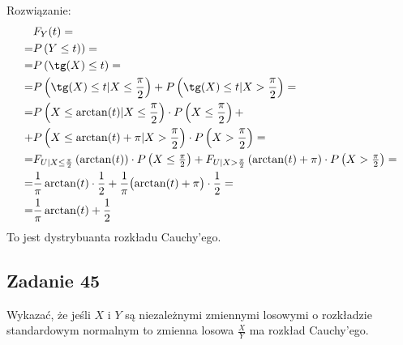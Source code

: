 Rozwiązanie:
\begin{align*}
&F_Y(t)
=\\=&
P\left(Y\le t)\right)
=\\=&
P\left(\tg(X)\le t\right)
=\\=&
P\left(\tg(X)\le t|X\le\frac{\pi}{2}\right)
+
P\left(\tg(X)\le t|X>\frac{\pi}{2}\right)
=\\=&
P\left(X\le\arctan(t)|X\le\frac{\pi}{2}\right)\cdot P\left(X\le\frac{\pi}{2}\right)
+\\+&
P\left(X\le\arctan(t)+\pi|X>\frac{\pi}{2}\right)\cdot P\left(X>\frac{\pi}{2}\right)
=\\=&
F_{U|X\le\frac{\pi}{2}}\left(\arctan(t)\right)\cdot P\left(X\le\tfrac{\pi}{2}\right)+
F_{U|X>\frac{\pi}{2}}\left(\arctan(t)+\pi\right)\cdot P\left(X>\tfrac{\pi}{2}\right)
=\\=&
\frac{1}{\pi}\arctan(t)\cdot \frac{1}{2}+
\frac{1}{\pi}\bigl(\arctan(t)+\pi\bigr)\cdot \frac{1}{2}
=\\=&
\frac{1}{\pi}\arctan(t)+\frac{1}{2}
\end{align*}
To jest dystrybuanta rozkładu Cauchy'ego.


\subsection*{Zadanie 45}
Wykazać, że jeśli $ X $ i $ Y $ są niezależnymi zmiennymi losowymi o rozkładzie standardowym normalnym to zmienna losowa $ \frac{X}{Y} $ ma rozkład Cauchy'ego.

